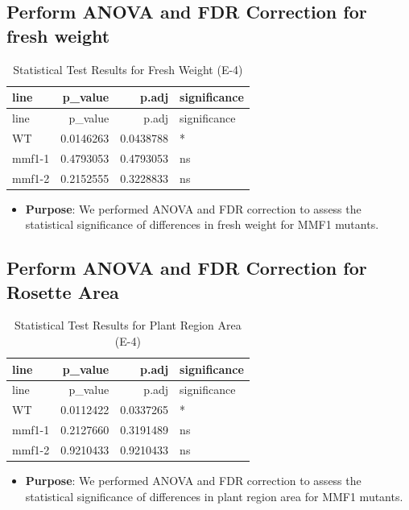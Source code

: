 \documentclass[
  10pt,
]{article}
\providecommand{\tightlist}{%
  \setlength{\itemsep}{0pt}\setlength{\parskip}{0pt}}\usepackage{longtable,booktabs,array}
\begin{document}
\subsection{Perform ANOVA and FDR Correction for fresh
weight}\label{perform-anova-and-fdr-correction-for-fresh-weight-1}

\begin{longtable}[]{@{}lrrl@{}}
\caption{Statistical Test Results for Fresh Weight (E-4)}\tabularnewline
\toprule\noalign{}
line & p\_value & p.adj & significance \\
\midrule\noalign{}
\endfirsthead
\toprule\noalign{}
line & p\_value & p.adj & significance \\
\midrule\noalign{}
\endhead
\bottomrule\noalign{}
\endlastfoot
WT & 0.0146263 & 0.0438788 & * \\
mmf1-1 & 0.4793053 & 0.4793053 & ns \\
mmf1-2 & 0.2152555 & 0.3228833 & ns \\
\end{longtable}

\begin{itemize}
\tightlist
\item
  \textbf{Purpose}: We performed ANOVA and FDR correction to assess the
  statistical significance of differences in fresh weight for MMF1
  mutants.
\end{itemize}

\subsection{Perform ANOVA and FDR Correction for Rosette
Area}\label{perform-anova-and-fdr-correction-for-rosette-area-1}

\begin{longtable}[]{@{}lrrl@{}}
\caption{Statistical Test Results for Plant Region Area
(E-4)}\tabularnewline
\toprule\noalign{}
line & p\_value & p.adj & significance \\
\midrule\noalign{}
\endfirsthead
\toprule\noalign{}
line & p\_value & p.adj & significance \\
\midrule\noalign{}
\endhead
\bottomrule\noalign{}
\endlastfoot
WT & 0.0112422 & 0.0337265 & * \\
mmf1-1 & 0.2127660 & 0.3191489 & ns \\
mmf1-2 & 0.9210433 & 0.9210433 & ns \\
\end{longtable}

\begin{itemize}
\tightlist
\item
  \textbf{Purpose}: We performed ANOVA and FDR correction to assess the
  statistical significance of differences in plant region area for MMF1
  mutants.
\end{itemize}
\end{document}
